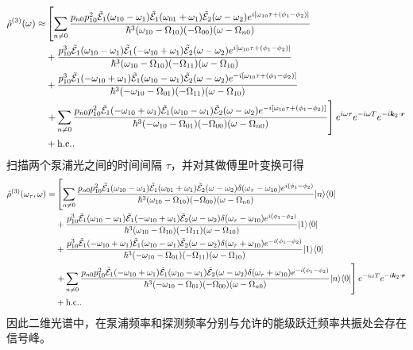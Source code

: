 \documentclass{thesis}
\begin{document}
\begin{align}
    \notag\hat{\rho}^{(3)}(\omega)\approx&\left[\sum_{n\neq 0}\frac{p_{n0}p_{10}^2\tilde{\mathcal{E}}_1(\omega_{10}-\omega_1)\tilde{\mathcal{E}}_1(\omega_{01}+\omega_1)\tilde{\mathcal{E}}_2(\omega-\omega_2)e^{i[\omega_{10}\tau+(\phi_1-\phi_2)]}}{\hbar^3(\omega_{10}-\Omega_{10})(-\Omega_{00})(\omega-\Omega_{n0})}\right.\\
    \notag&+\frac{p_{10}^3\tilde{\mathcal{E}}_1(\omega_{10}-\omega_1)\tilde{\mathcal{E}}_1(-\omega_{10}+\omega_1)\tilde{\mathcal{E}}_2(\omega-\omega_2)e^{i[\omega_{10}\tau+(\phi_1-\phi_2)]}}{\hbar^3(\omega_{10}-\Omega_{10})(-\Omega_{11})(\omega-\Omega_{10})}\\
    \notag&+\frac{p_{10}^3\tilde{\mathcal{E}}_1(-\omega_{10}+\omega_1)\tilde{\mathcal{E}}_1(\omega_{10}-\omega_1)\tilde{\mathcal{E}}_2(\omega-\omega_2)e^{-i[\omega_{10}\tau+(\phi_1-\phi_2)]}}{\hbar^3(-\omega_{10}-\Omega_{01})(-\Omega_{11})(\omega-\Omega_{10})}\\
    \notag&\left.+\sum_{n\neq 0}\frac{p_{n0}p_{10}^2\tilde{\mathcal{E}}_1(-\omega_{10}+\omega_1)\tilde{\mathcal{E}}_1(\omega_{10}-\omega_1)\tilde{\mathcal{E}}_2(\omega-\omega_2)e^{-i[\omega_{10}\tau+(\phi_1-\phi_2)]}}{\hbar^3(-\omega_{10}-\Omega_{01})(-\Omega_{00})(\omega-\Omega_{n0})}\right]e^{i\omega\tau}e^{-i\omega T}e^{-i\bm{k}_2\cdot\bm{r}}\\
    &+\text{h.c.}.
\end{align}
扫描两个泵浦光之间的时间间隔 $\tau$，并对其做傅里叶变换可得
{\small
\begin{align}
    \notag\hat{\rho}^{(3)}(\omega_{\tau},\omega)=&\left[\sum_{n\neq 0}\frac{p_{n0}p_{10}^2\tilde{\mathcal{E}}_1(\omega_{10}-\omega_1)\tilde{\mathcal{E}}_1(\omega_{01}+\omega_1)\tilde{\mathcal{E}}_2(\omega-\omega_2)\delta(\omega_{\tau}-\omega_{10})e^{i(\phi_1-\phi_2)}}{\hbar^3(\omega_{10}-\Omega_{10})(-\Omega_{00})(\omega-\Omega_{n0})}\lvert n\rangle\langle 0\rvert\right.\\
    \notag&+\frac{p_{10}^3\tilde{\mathcal{E}}_1(\omega_{10}-\omega_1)\tilde{\mathcal{E}}_1(-\omega_{10}+\omega_1)\tilde{\mathcal{E}}_2(\omega-\omega_2)\delta(\omega_{\tau}-\omega_{10})e^{i(\phi_1-\phi_2)}}{\hbar^3(\omega_{10}-\Omega_{10})(-\Omega_{11})(\omega-\Omega_{10})}\lvert 1\rangle\langle 0\rvert\\
    \notag&+\frac{p_{10}^3\tilde{\mathcal{E}}_1(-\omega_{10}+\omega_1)\tilde{\mathcal{E}}_1(\omega_{10}-\omega_1)\tilde{\mathcal{E}}_2(\omega-\omega_2)\delta(\omega_{\tau}+\omega_{10})e^{-i(\phi_1-\phi_2)}}{\hbar^3(-\omega_{10}-\Omega_{01})(-\Omega_{11})(\omega-\Omega_{10})}\lvert 1\rangle\langle 0\rvert\\
    \notag&\left.+\sum_{n\neq 0}\frac{p_{n0}p_{10}^2\tilde{\mathcal{E}}_1(-\omega_{10}+\omega_1)\tilde{\mathcal{E}}_1(\omega_{10}-\omega_1)\tilde{\mathcal{E}}_2(\omega-\omega_2)\delta(\omega_{\tau}+\omega_{10})e^{-i(\phi_1-\phi_2)}}{\hbar^3(-\omega_{10}-\Omega_{01})(-\Omega_{00})(\omega-\Omega_{n0})}\lvert n\rangle\langle 0\rvert\right]e^{-i\omega T}e^{-i\bm{k}_2\cdot\bm{r}}\\
    &+\text{h.c.}.
\end{align}
}%
因此二维光谱中，在泵浦频率和探测频率分别与允许的能级跃迁频率共振处会存在信号峰。
\end{document}
